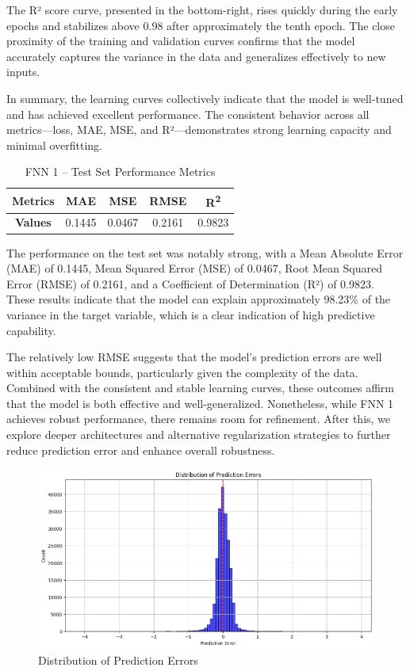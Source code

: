 The R² score curve, presented in the bottom-right, rises quickly during the early epochs and stabilizes above 0.98 after approximately the tenth epoch. The close proximity of the training and validation curves confirms that the model accurately captures the variance in the data and generalizes effectively to new inputs.

In summary, the learning curves collectively indicate that the model is well-tuned and has achieved excellent performance. The consistent behavior across all metrics—loss, MAE, MSE, and R²—demonstrates strong learning capacity and minimal overfitting. 

\begin{table}[H]
\centering
\caption{FNN 1 – Test Set Performance Metrics}
\begin{tabular}{||c|c|c|c|c||}
\hline
\textbf{Metrics} & MAE & MSE & RMSE & R\textsuperscript{2} \\
\hline\hline
\textbf{Values} & 0.1445 & 0.0467 & 0.2161 & 0.9823 \\
\hline
\end{tabular}
\label{tab:fnn1_test_metrics}
\end{table}

The performance on the test set was notably strong, with a Mean Absolute Error (MAE) of 0.1445, Mean Squared Error (MSE) of 0.0467, Root Mean Squared Error (RMSE) of 0.2161, and a Coefficient of Determination (R²) of 0.9823. These results indicate that the model can explain approximately 98.23\% of the variance in the target variable, which is a clear indication of high predictive capability.

The relatively low RMSE suggests that the model's prediction errors are well within acceptable bounds, particularly given the complexity of the data. Combined with the consistent and stable learning curves, these outcomes affirm that the model is both effective and well-generalized. Nonetheless, while FNN 1 achieves robust performance, there remains room for refinement. After this, we explore deeper architectures and alternative regularization strategies to further reduce prediction error and enhance overall robustness.

\begin{figure}[H]
    \centering
    \includegraphics[width=0.8\linewidth]{images/fnn0-de.png}
    \caption{Distribution of Prediction Errors}
    \label{fig:enter-label}
\end{figure}

